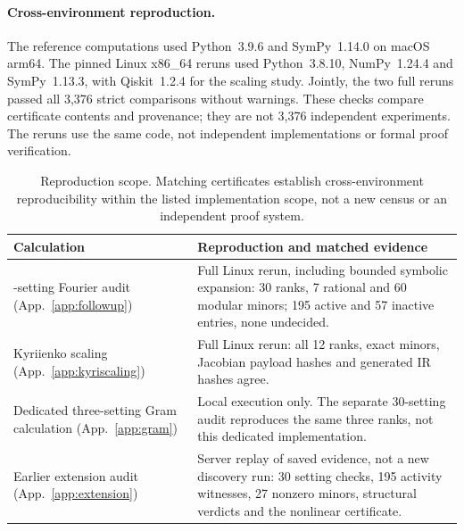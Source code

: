 \paragraph{Cross-environment reproduction.}
The reference computations used Python~3.9.6 and SymPy~1.14.0 on
macOS arm64. The pinned Linux x86\_64 reruns used Python~3.8.10,
NumPy~1.24.4 and SymPy~1.13.3, with Qiskit~1.2.4 for the scaling
study. Jointly, the two full reruns passed all 3,376 strict
comparisons without warnings. These checks compare certificate
contents and provenance; they are not 3,376 independent experiments.
The reruns use the same code, not independent implementations or
formal proof verification.

\begin{table}[t]
\caption{Reproduction scope. Matching certificates establish
cross-environment reproducibility within the listed implementation
scope, not a new census or an independent proof system.}
\label{tab:reproscope}
\begin{tabular}{>{\raggedright\arraybackslash}p{}
                >{\raggedright\arraybackslash}p{}}
\toprule
Calculation & Reproduction and matched evidence\\
\midrule
30-setting Fourier audit (App.~\ref{app:followup})
& Full Linux rerun, including bounded symbolic expansion: 30 ranks,
7 rational and 60 modular minors; 195 active and 57 inactive entries,
none undecided.\\[4pt]
Kyriienko scaling (App.~\ref{app:kyriscaling})
& Full Linux rerun: all 12 ranks, exact minors, Jacobian payload
hashes and generated IR hashes agree.\\[4pt]
Dedicated three-setting Gram calculation (App.~\ref{app:gram})
& Local execution only. The separate 30-setting audit reproduces the
same three ranks, not this dedicated implementation.\\[4pt]
Earlier extension audit (App.~\ref{app:extension})
& Server replay of saved evidence, not a new discovery run: 30
setting checks, 195 activity witnesses, 27 nonzero minors, structural
verdicts and the nonlinear certificate.\\
\bottomrule
\end{tabular}
\end{table}
